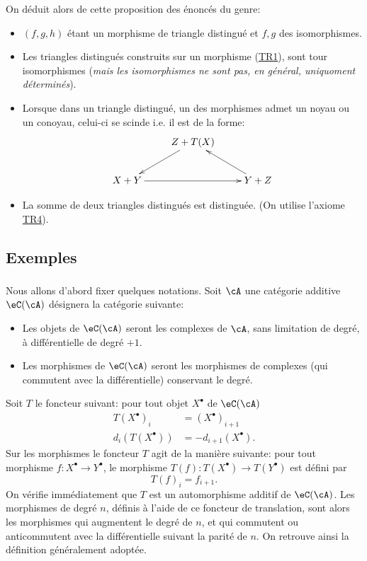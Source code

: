 On déduit alors de cette proposition des énoncés du genre: 
\begin{itemize}
  \item $(f,g,h)$ étant un morphisme de triangle distingué et $f,g$ des 
    isomorphismes. 
  \item Les triangles distingués construits sur un morphisme 
    (\hyperlink{VIII:TR1}{TR1}), sont tour isomorphismes (\emph{mais les 
    isomorphismes ne sont pas, en général, uniquoment déterminés}). 
  \item Lorsque dans un triangle distingué, un des morphismes admet un noyau 
    ou un conoyau, celui-ci se scinde i.e. il est de la forme: 
    \[\xymatrix{
      & Z+T(X) \ar[dl] \\
      X+Y \ar[rr] 
        & & Y+Z \ar[ul]
    }\]
  \item La somme de deux triangles distingués est distinguée. (On utilise 
    l'axiome \hyperlink{VIII:TR4}{TR4}). 
\end{itemize}










\subsection{Exemples}\label{VIII:1-2}





\subsubsection{}\label{VIII:1-2-1}

Nous allons d'abord fixer quelques notations. Soit $\cA$ une catégorie 
additive $\eC(\cA)$ désignera la catégorie suivante: 
\begin{itemize}
  \item Les objets de $\eC(\cA)$ seront les complexes de $\cA$, sans limitation 
    de degré, à différentielle de degré $+1$. 
  \item Les morphismes de $\eC(\cA)$ seront les morphismes de complexes (qui 
    commutent avec la différentielle) conservant le degré. 
\end{itemize}

Soit $T$ le foncteur suivant: pour tout objet $X^\bullet$ de $\eC(\cA)$ 
\begin{align*}
  T(X^\bullet)_i &= (X^\bullet)_{i+1} \\
  d_i(T(X^\bullet)) &= -d_{i+1}(X^\bullet)  \text{.}
\end{align*}
Sur les morphismes le foncteur $T$ agit de la manière suivante: pour tout 
morphisme $f:X^\bullet \to Y^\bullet$, le morphisme 
$T(f):T(X^\bullet) \to T(Y^\bullet)$ est défini par 
\[
  T(f)_i = f_{i+1} \text{.}
\]
On vérifie immédiatement que $T$ est un automorphisme additif de 
$\eC(\cA)$. Les morphismes de degré $n$, définis à l'aide de ce foncteur 
de translation, sont alors les morphismes qui augmentent le degré de $n$, et 
qui commutent ou anticommutent avec la différentielle suivant la parité de 
$n$. On retrouve ainsi la définition généralement adoptée. 

